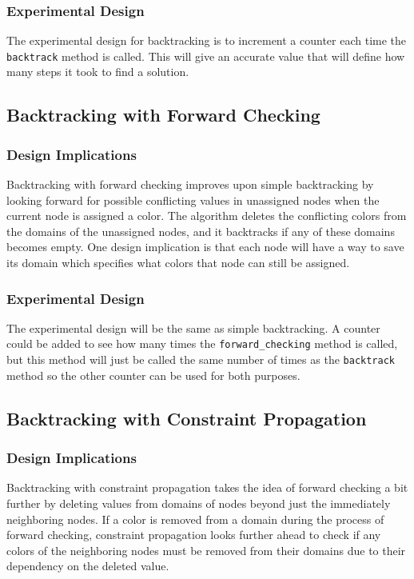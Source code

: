 \documentclass{article}
\begin{document}
\begin{multicols}{2}
\subsubsection{Experimental Design}
The experimental design for backtracking is to increment a counter each time the \texttt{backtrack} method is called. This will give an accurate value that will define how many steps it took to find a solution. 

\subsection{Backtracking with Forward Checking}
\subsubsection{Design Implications}
Backtracking with forward checking improves upon simple backtracking by looking forward for possible conflicting values in unassigned nodes when the current node is assigned a color.  The algorithm deletes the conflicting colors from the domains of the unassigned nodes, and it backtracks if any of these domains becomes empty. 
One design implication is that each node will have a way to save its domain which specifies what colors that node can still be assigned.

\subsubsection{Experimental Design}
The experimental design will be the same as simple backtracking. A counter could be added to see how many times the \texttt{forward\_checking}  method is called, but this method will just be called the same number of times as the \texttt{backtrack} method so the other counter can be used for both purposes.

\subsection{Backtracking with Constraint Propagation}
\subsubsection{Design Implications}
Backtracking with constraint propagation takes the idea of forward checking a bit further by deleting values from domains of nodes beyond just the immediately neighboring nodes.  If a color is removed from a domain during the process of forward checking, constraint propagation looks further ahead to check if any colors of the neighboring nodes must be removed from their domains due to their dependency on the deleted value. 

\end{multicols}
\end{document}
